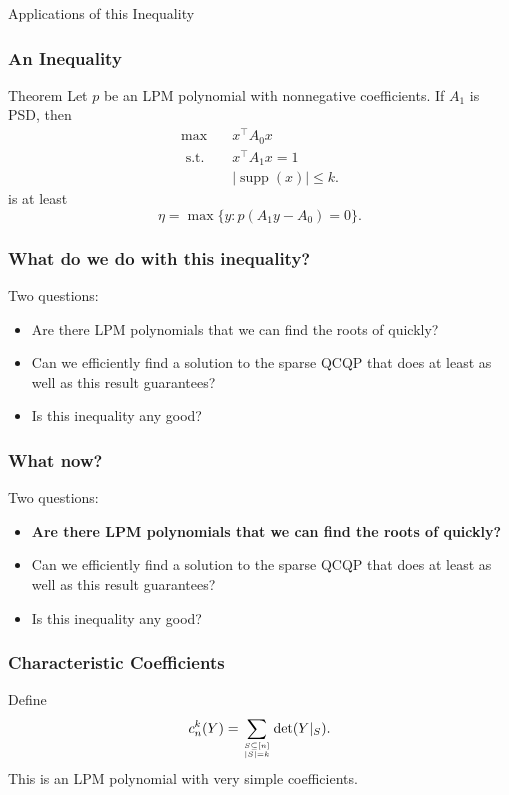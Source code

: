\documentclass{beamer}
\DeclareMathOperator*{\supp}{supp}
\newcommand{\st}{{\text{ s.t. }}}
\renewcommand\top[2]{\genfrac{}{}{0pt}{}{#1}{#2}}
\begin{document}
\begin{frame}
    \centering
    \huge
    {\color{gray}Applications of this Inequality}
\end{frame}
\begin{frame}
    \frametitle{An Inequality}
    \begin{block}{Theorem}
        Let $p$ be an LPM polynomial with nonnegative coefficients.  If $A_1$ is PSD, then
        \begin{equation*}
            \begin{aligned}
                \max\quad & x^{\intercal}A_0x\\
                \st & x^{\intercal}A_1x = 1\\
                    &|\supp(x)| \le k.
            \end{aligned}
        \end{equation*}
        is at least 
        \[
            \eta = \max \{y : p(A_1y-A_0) = 0 \}.
        \]
    \end{block}
\end{frame}
\begin{frame}
    \frametitle{What do we do with this inequality?}
    Two questions:
    \begin{itemize}
        \item Are there LPM polynomials that we can find the roots of quickly?
        \pause 
        \item Can we efficiently find a solution to the sparse QCQP that does at least as well as this result guarantees?
        \pause
        \item Is this inequality any good?
    \end{itemize}
\end{frame}
\begin{frame}
    \frametitle{What now?}
    Two questions:
    \begin{itemize}
        \item \textbf{Are there LPM polynomials that we can find the roots of quickly?}
        \item Can we efficiently find a solution to the sparse QCQP that does at least as well as this result guarantees?
        \item Is this inequality any good?
    \end{itemize}
\end{frame}
\begin{frame}
    \frametitle{Characteristic Coefficients}
    Define
    \[
        c_n^k(Y) = \sum_{\top{S \subseteq [n]}{|S| = k}}  \det(Y|_S).
    \]
    \pause 
    This is an LPM polynomial with very simple coefficients.
\end{frame}
\end{document}
